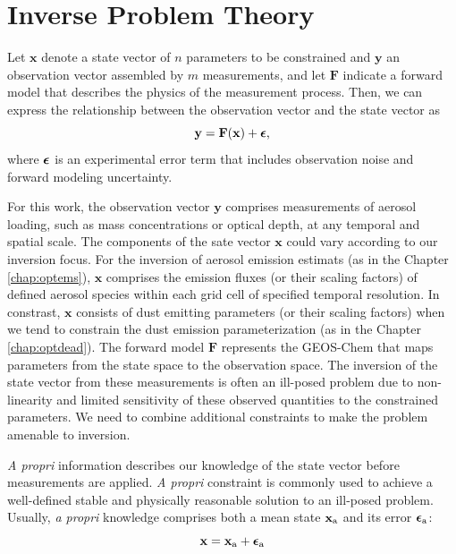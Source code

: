 \section{Inverse Problem Theory} \label{sec:inv}

Let $\mathbf{x}$ denote a state vector of $n$ parameters to be constrained
 and $\mathbf{y}$ an observation vector assembled by $m$ measurements,
 and let $\mathbf{F}$ indicate a forward model that describes the physics of
 the measurement process. Then, we can express the relationship between
 the observation vector and the state vector as
 \begin{equation} \label{eq:fx}
 \mathbf{y} = \mathbf{F}(\mathbf{x}) + \boldsymbol{\epsilon} \mbox{,}
 \end{equation}
 where $\boldsymbol{\epsilon}$ is an experimental error term that includes
 observation noise and forward modeling uncertainty.

 For this work, the observation
 vector $\mathbf{y}$ comprises measurements of
 aerosol loading, such as mass concentrations or optical depth, at any temporal
 and spatial scale. The components of the sate vector $\mathbf{x}$ could vary
 according to our inversion focus. For the inversion of aerosol emission estimats
 (as in the Chapter \ref{chap:optems}),
 $\mathbf{x}$ comprises the emission fluxes (or their scaling factors) of defined
 aerosol species within each grid cell of specified temporal resolution.
 In constrast, $\mathbf{x}$ consists of
 dust emitting parameters (or their scaling factors) when we tend to constrain
 the dust emission parameterization (as in the Chapter \ref{chap:optdead}).
 The forward model $\mathbf{F}$
 represents the GEOS-Chem that maps parameters from the state space to the
 observation space. The inversion of the state vector from these measurements is often
 an ill-posed problem due to non-linearity and limited sensitivity of these observed
 quantities to the constrained parameters. We need to combine additional constraints
 to make the problem amenable to inversion.

 \textit{A propri} information describes our knowledge of the state vector before measurements
 are applied. \textit{A propri} constraint is commonly used to achieve a well-defined stable
 and physically reasonable solution to an ill-posed problem. Usually, \textit{a propri}
 knowledge comprises both a mean state $\mathbf{x}_\text{a}$ and its error
 $\boldsymbol{\epsilon}_\text{a}$:
 \begin{equation} \label{eq:xa}
  \mathbf{x} = \mathbf{x}_\text{a} + \boldsymbol{\epsilon}_\text{a}
 \end{equation}


